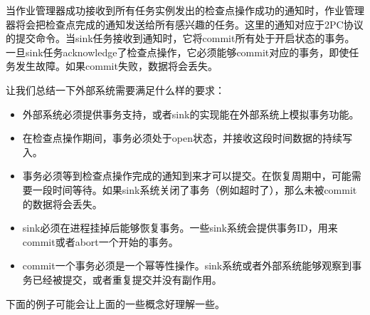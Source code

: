 \documentclass[cn,11pt,chinese]{elegantbook}
\begin{document}
当作业管理器成功接收到所有任务实例发出的检查点操作成功的通知时，作业管理器将会把检查点完成的通知发送给所有感兴趣的任务。这里的通知对应于2PC协议的提交命令。当sink任务接收到通知时，它将commit所有处于开启状态的事务。一旦sink任务acknowledge了检查点操作，它必须能够commit对应的事务，即使任务发生故障。如果commit失败，数据将会丢失。

让我们总结一下外部系统需要满足什么样的要求：

\begin{itemize}
    \item 外部系统必须提供事务支持，或者sink的实现能在外部系统上模拟事务功能。
    \item 在检查点操作期间，事务必须处于open状态，并接收这段时间数据的持续写入。
    \item 事务必须等到检查点操作完成的通知到来才可以提交。在恢复周期中，可能需要一段时间等待。如果sink系统关闭了事务（例如超时了），那么未被commit的数据将会丢失。
    \item sink必须在进程挂掉后能够恢复事务。一些sink系统会提供事务ID，用来commit或者abort一个开始的事务。
    \item commit一个事务必须是一个幂等性操作。sink系统或者外部系统能够观察到事务已经被提交，或者重复提交并没有副作用。
\end{itemize}

下面的例子可能会让上面的一些概念好理解一些。
\end{document}
